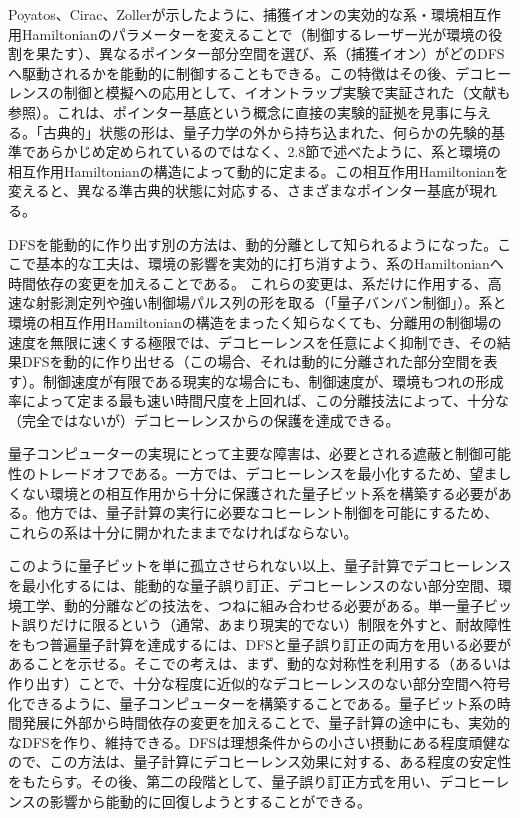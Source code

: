 Poyatos、Cirac、Zoller\cite{ref377}が示したように、捕獲イオンの実効的な系・環境相互作用Hamiltonianのパラメーターを変えることで（制御するレーザー光が環境の役割を果たす）、異なるポインター部分空間を選び、系（捕獲イオン）がどのDFSへ駆動されるかを能動的に制御することもできる。この特徴はその後、デコヒーレンスの制御と模擬への応用として、イオントラップ実験で実証された\cite{ref125,ref353}（文献\cite{ref378}も参照）。これは、ポインター基底という概念に直接の実験的証拠を見事に与える。「古典的」状態の形は、量子力学の外から持ち込まれた、何らかの先験的基準であらかじめ定められているのではなく、2.8節で述べたように、系と環境の相互作用Hamiltonianの構造によって動的に定まる。この相互作用Hamiltonianを変えると、異なる準古典的状態に対応する、さまざまなポインター基底が現れる。

DFSを能動的に作り出す別の方法は、動的分離として知られるようになった\cite{ref379,ref380,ref381,ref382,ref383,ref384}。ここで基本的な工夫は、環境の影響を実効的に打ち消すよう、系のHamiltonianへ時間依存の変更を加えることである。
\hypertarget{srcpage:327}{}\label{srcpage:327}
これらの変更は、系だけに作用する、高速な射影測定列や強い制御場パルス列の形を取る（「量子バンバン制御」\cite{ref379}）。系と環境の相互作用Hamiltonianの構造をまったく知らなくても、分離用の制御場の速度を無限に速くする極限では、デコヒーレンスを任意によく抑制でき、その結果DFSを動的に作り出せる（この場合、それは動的に分離された部分空間を表す）。制御速度が有限である現実的な場合にも、制御速度が、環境もつれの形成率によって定まる最も速い時間尺度を上回れば、この分離技法によって、十分な（完全ではないが）デコヒーレンスからの保護を達成できる。

量子コンピューターの実現にとって主要な障害は、必要とされる遮蔽と制御可能性のトレードオフである。一方では、デコヒーレンスを最小化するため、望ましくない環境との相互作用から十分に保護された量子ビット系を構築する必要がある。他方では、量子計算の実行に必要なコヒーレント制御を可能にするため、これらの系は十分に開かれたままでなければならない。

このように量子ビットを単に孤立させられない以上、量子計算でデコヒーレンスを最小化するには、能動的な量子誤り訂正、デコヒーレンスのない部分空間、環境工学、動的分離などの技法を、つねに組み合わせる必要がある。単一量子ビット誤りだけに限るという（通常、あまり現実的でない）制限を外すと、耐故障性をもつ普遍量子計算を達成するには、DFSと量子誤り訂正の両方を用いる必要があることを示せる\cite{ref373}。そこでの考えは、まず、動的な対称性を利用する（あるいは作り出す）ことで、十分な程度に近似的なデコヒーレンスのない部分空間へ符号化できるように、量子コンピューターを構築することである。量子ビット系の時間発展に外部から時間依存の変更を加えることで、量子計算の途中にも、実効的なDFSを作り、維持できる。DFSは理想条件からの小さい摂動にある程度頑健なので、この方法は、量子計算にデコヒーレンス効果に対する、ある程度の安定性をもたらす。その後、第二の段階として、量子誤り訂正方式を用い、デコヒーレンスの影響から能動的に回復しようとすることができる。

